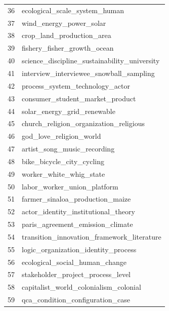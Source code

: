 \documentclass[12pt]{article}
\begin{document}
\begin{landscape}
\begin{figure}[htbp]
\begin{minipage}{0.25\textwidth}
\begin{tabular}{rl}
           36 &                      ecological\_scale\_system\_human \\
           37 &                            wind\_energy\_power\_solar \\
           38 &                          crop\_land\_production\_area \\
           39 &                        fishery\_fisher\_growth\_ocean \\
           40 &       science\_discipline\_sustainability\_university \\
           41 &            interview\_interviewee\_snowball\_sampling \\
           42 &                    process\_system\_technology\_actor \\
           43 &                    consumer\_student\_market\_product \\
           44 &                        solar\_energy\_grid\_renewable \\
           45 &             church\_religion\_organization\_religious \\
           46 &                            god\_love\_religion\_world \\
           47 &                        artist\_song\_music\_recording \\
           48 &                          bike\_bicycle\_city\_cycling \\
           49 &                            worker\_white\_whig\_state \\
           50 &                        labor\_worker\_union\_platform \\
           51 &                    farmer\_sinaloa\_production\_maize \\
           52 &                actor\_identity\_institutional\_theory \\
           53 &                   paris\_agreement\_emission\_climate \\
           54 &         transition\_innovation\_framework\_literature \\
           55 &                logic\_organization\_identity\_process \\
           56 &                     ecological\_social\_human\_change \\
           57 &                  stakeholder\_project\_process\_level \\
           58 &              capitalist\_world\_colonialism\_colonial \\
           59 &                   qca\_condition\_configuration\_case \\

\end{tabular}
\end{minipage}
\end{figure}
\end{landscape}
\end{document}
